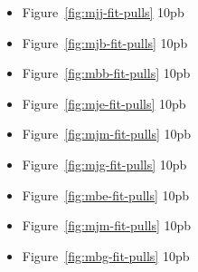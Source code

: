 \begin{multicols}{3}
    \begin{itemize}
    \item Figure~\ref{fig:mjj-fit-pulls} 10pb \mjj
    \item Figure~\ref{fig:mjb-fit-pulls} 10pb \mjb
    \item Figure~\ref{fig:mbb-fit-pulls} 10pb \mbb
    \item Figure~\ref{fig:mje-fit-pulls} 10pb \mje
    \item Figure~\ref{fig:mjm-fit-pulls} 10pb \mjmu
    \item Figure~\ref{fig:mjg-fit-pulls} 10pb \mjph
    \item Figure~\ref{fig:mbe-fit-pulls} 10pb \mbe
    \item Figure~\ref{fig:mjm-fit-pulls} 10pb \mbmu
    \item Figure~\ref{fig:mbg-fit-pulls} 10pb \mbph
    \end{itemize}
 \end{multicols}

\newpage



\newpage

